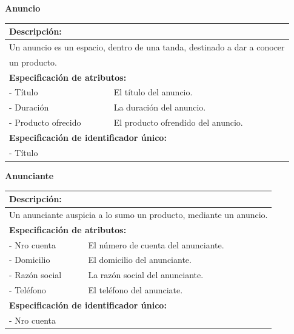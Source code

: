 \documentclass[a4paper,10pt]{article}
\begin{document}
    \begin{flushleft}
      \begin{large} \bf{Anuncio} \end{large}
    \end{flushleft}
      \begin{tabular}{| p{2cm} | p{9cm} |}
	\hline
	\multicolumn{2}{|l|}{\bf{Descripci\'on:}} \\
	\hline
	\multicolumn{2}{|l|}{Un anuncio es un espacio, dentro de una tanda, destinado a dar a conocer} \\
	\multicolumn{2}{|l|}{un producto.} \\
	\hline	
	\hline	
	\multicolumn{2}{|l|}{\bf{Especificaci\'on de atributos:}} \\
	\hline
	- T\'itulo & El t\'itulo del anuncio. \\
	\hline \hline
	- Duraci\'on & La duraci\'on del anuncio. \\
	\hline \hline
	- Producto \newline ofrecido & El producto ofrendido del anuncio. \\
	\hline
	\multicolumn{2}{|l|}{\bf{Especificaci\'on de identificador \'unico:}} \\
	\hline
	\multicolumn{2}{|l|}{- T\'itulo} \\
	\hline
      \end{tabular}

    \begin{flushleft}
      \begin{large} \bf{Anunciante} \end{large}
    \end{flushleft}
      \begin{tabular}{| p{2cm} | p{9cm} |}
	\hline
	\multicolumn{2}{|l|}{\bf{Descripci\'on:}} \\
	\hline
	\multicolumn{2}{|l|}{Un anunciante auspicia a lo sumo un producto, mediante un anuncio.} \\
	\hline	
	\multicolumn{2}{|l|}{\bf{Especificaci\'on de atributos:}} \\
	\hline
	- Nro cuenta & El n\'umero de cuenta del anunciante. \\
	\hline \hline
	- Domicilio & El domicilio del anunciante. \\
	\hline \hline
	- Raz\'on \newline social & La raz\'on social del anunciante. \\
	\hline \hline
	- Tel\'efono & El tel\'efono del anunciate. \\
	\hline
	\multicolumn{2}{|l|}{\bf{Especificaci\'on de identificador \'unico:}} \\
	\hline
	\multicolumn{2}{|l|}{- Nro cuenta} \\
	\hline
      \end{tabular}
\end{document}
